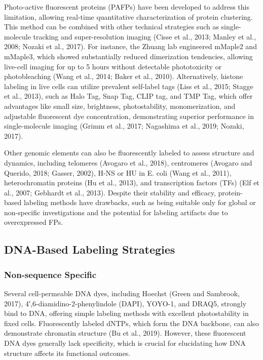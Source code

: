 Photo-active fluorescent proteins (PAFPs) have been developed to address this limitation, allowing real-time quantitative characterization of protein clustering. This method can be combined with other technical strategies such as single-molecule tracking and super-resolution imaging (Cisse et al., 2013; Manley et al., 2008; Nozaki et al., 2017). For instance, the Zhuang lab engineered mMaple2 and mMaple3, which showed substantially reduced dimerization tendencies, allowing live-cell imaging for up to 5 hours without detectable phototoxicity or photobleaching (Wang et al., 2014; Baker et al., 2010). Alternatively, histone labeling in live cells can utilize prevalent self-label tags (Liss et al., 2015; Stagge et al., 2013), such as Halo Tag, Snap Tag, CLIP tag, and TMP Tag, which offer advantages like small size, brightness, photostability, monomerization, and adjustable fluorescent dye concentration, demonstrating superior performance in single-molecule imaging (Grimm et al., 2017; Nagashima et al., 2019; Nozaki, 2017).

Other genomic elements can also be fluorescently labeled to assess structure and dynamics, including telomeres (Avogaro et al., 2018), centromeres (Avogaro and Querido, 2018; Gasser, 2002), H-NS or HU in E. coli (Wang et al., 2011), heterochromatin proteins (Hu et al., 2013), and transcription factors (TFs) (Elf et al., 2007; Gebhardt et al., 2013). Despite their stability and efficacy, protein-based labeling methods have drawbacks, such as being suitable only for global or non-specific investigations and the potential for labeling artifacts due to overexpressed FPs.

\subsection{DNA-Based Labeling Strategies}

\subsubsection{Non-sequence Specific}

Several cell-permeable DNA dyes, including Hoechst (Green and Sambrook, 2017), 4′,6-diamidino-2-phenylindole (DAPI), YOYO-1, and DRAQ5, strongly bind to DNA, offering simple labeling methods with excellent photostability in fixed cells. Fluorescently labeled dNTPs, which form the DNA backbone, can also demonstrate chromatin structure (Bu et al., 2019). However, these fluorescent DNA dyes generally lack specificity, which is crucial for elucidating how DNA structure affects its functional outcomes.

